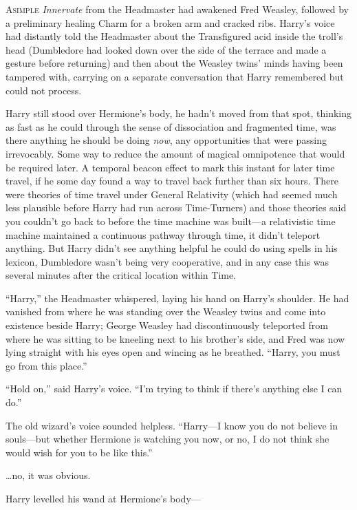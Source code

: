 
\lettrine{A}{simple} \emph{Innervate} from the Headmaster had awakened Fred Weasley, followed by a preliminary healing Charm for a broken arm and cracked ribs. Harry’s voice had distantly told the Headmaster about the Transfigured acid inside the troll’s head (Dumbledore had looked down over the side of the terrace and made a gesture before returning) and then about the Weasley twins’ minds having been tampered with, carrying on a separate conversation that Harry remembered but could not process.

Harry still stood over Hermione’s body, he hadn’t moved from that spot, thinking as fast as he could through the sense of dissociation and fragmented time, was there anything he should be doing \emph{now}, any opportunities that were passing irrevocably. Some way to reduce the amount of magical omnipotence that would be required later. A temporal beacon effect to mark this instant for later time travel, if he some day found a way to travel back further than six hours. There were theories of time travel under General Relativity (which had seemed much less plausible before Harry had run across Time-Turners) and those theories said you couldn’t go back to before the time machine was built—a relativistic time machine maintained a continuous pathway through time, it didn’t teleport anything. But Harry didn’t see anything helpful he could do using spells in his lexicon, Dumbledore wasn’t being very cooperative, and in any case this was several minutes after the critical location within Time.

“Harry,” the Headmaster whispered, laying his hand on Harry’s shoulder. He had vanished from where he was standing over the Weasley twins and come into existence beside Harry; George Weasley had discontinuously teleported from where he was sitting to be kneeling next to his brother’s side, and Fred was now lying straight with his eyes open and wincing as he breathed. “Harry, you must go from this place.”

“Hold on,” said Harry’s voice. “I’m trying to think if there’s anything else I can do.”

The old wizard’s voice sounded helpless. “Harry—I know you do not believe in souls—but whether Hermione is watching you now, or no, I do not think she would wish for you to be like this.”

…no, it was obvious.

Harry levelled his wand at Hermione’s body—

